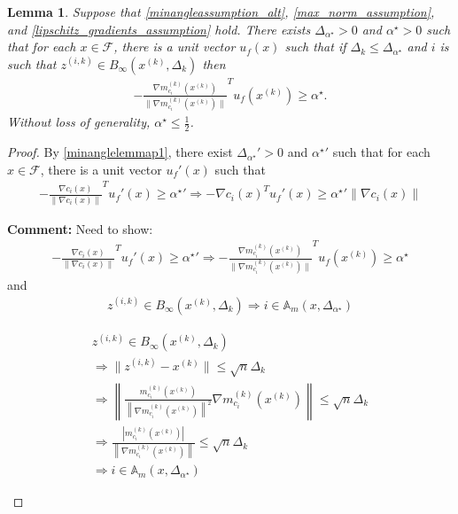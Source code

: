 \documentclass{article}
\newenvironment{comment}
  {\par\medskip
   \color{red}%
   \begin{framed}
   \textbf{Comment: }\ignorespaces}
 {\end{framed}
  \medskip}
\newtheorem{lemma}[theorem]{Lemma}
\theoremstyle{case}
\numberwithin{theorem}{subsection}
\newcommand{\dk}{\Delta_k}
\newcommand{\feasible}{{\mathcal F}}
\newcommand{\gmcik}{{\nabla m_{c_i}^{(k)}\left(\xk\right)}}
\newcommand{\minanglealpha}{{ \alpha^{\star} }}
\newcommand{\minangledelta}{{\Delta_{\alpha^{\star}}}}
\newcommand{\xk}{{x^{(k)}}}
\newcommand{\zik}{{z^{(i, k)}}}
\newcommand{\minangledir}{{u_f}}
\newcommand{\epsactivemodels}{{\mathbb A_{m}}}
\begin{document}
\color{red}
\begin{lemma}
\label{minanglelemmap2}
Suppose that \cref{minangleassumption_alt}, \cref{max_norm_assumption}, and \cref{lipschitz_gradients_assumption} hold.
There exists $\minangledelta > 0$ and $\minanglealpha > 0$ such that for each $x \in \feasible$, there is a unit vector $\minangledir(x)$ such that
if $\dk \le \minangledelta$ and $i$ is such that $\zik \in B_{\infty}(\xk, \dk)$
then
\begin{align*}
-\frac {\gmcik}{\|\gmcik\|} ^T\minangledir(\xk) \ge \minanglealpha.
\end{align*}
Without loss of generality, $\minanglealpha \le \frac 1 2$.
\end{lemma}
\begin{proof}
By \cref{minanglelemmap1}, there exist $\minangledelta' > 0$ and $\minanglealpha'$ such that for each $x \in \feasible$, 
there is a unit vector $\minangledir'(x)$ such that
\begin{align*}
-\frac {\nabla c_i(x)}{\|\nabla c_i(x)\|}^T \minangledir'(x) \ge \minanglealpha'
\Longrightarrow -\nabla c_i(x)^T \minangledir'(x) \ge \minanglealpha' \|\nabla c_i(x)\|
\end{align*}

\begin{comment}
Need to show:
\begin{align*}
-\frac {\nabla c_i(x)}{\|\nabla c_i(x)\|}^T \minangledir'(x) \ge \minanglealpha' \Longrightarrow -\frac {\gmcik}{\|\gmcik\|} ^T\minangledir(\xk) \ge \minanglealpha
\end{align*}
and
\begin{align*}
\zik \in B_{\infty}(\xk, \dk) \Longrightarrow i \in \epsactivemodels(x, \minangledelta)
\end{align*}


\begin{align*}
\zik \in B_{\infty}(\xk, \dk) \\
\Longrightarrow \|\zik - \xk\| \le \sqrt{n}\dk \\
\Longrightarrow \left\|\frac{m^{(k)}_{c_i}(\xk)}{\left\|\gmcik\right\|^2} \gmcik\right\| \le \sqrt{n}\dk \\
\Longrightarrow \frac{|m^{(k)}_{c_i}(\xk)|}{\left\|\gmcik\right\|}  \le \sqrt{n}\dk \\
\Longrightarrow i \in \epsactivemodels(x, \minangledelta)
\end{align*}

\end{comment}
\end{proof}
\color{black}
\end{document}
